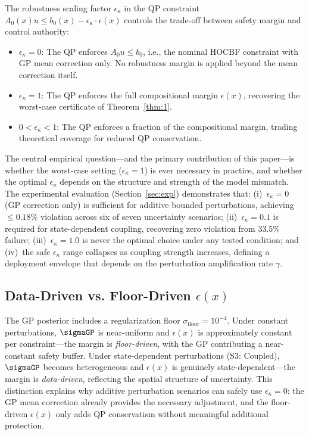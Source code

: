 The robustness scaling factor $\epsilon_\kappa$ in the QP constraint $A_0(x)u \leq b_0(x) - \epsilon_\kappa\cdot\epsilon(x)$ controls the trade-off between safety margin and control authority:

\begin{itemize}
    \item $\epsilon_\kappa = 0$: The QP enforces $A_0u \leq b_0$, i.e., the nominal HOCBF constraint with GP mean correction only. No robustness margin is applied beyond the mean correction itself.
    \item $\epsilon_\kappa = 1$: The QP enforces the full compositional margin $\epsilon(x)$, recovering the worst-case certificate of Theorem~\ref{thm:1}.
    \item $0 < \epsilon_\kappa < 1$: The QP enforces a fraction of the compositional margin, trading theoretical coverage for reduced QP conservatism.
\end{itemize}

The central empirical question---and the primary contribution of this paper---is whether the worst-case setting ($\epsilon_\kappa=1$) is ever necessary in practice, and whether the optimal $\epsilon_\kappa$ depends on the structure and strength of the model mismatch. The experimental evaluation (Section~\ref{sec:exp}) demonstrates that: (i)~$\epsilon_\kappa=0$ (GP correction only) is sufficient for additive bounded perturbations, achieving $\leq0.18\%$ violation across six of seven uncertainty scenarios; (ii)~$\epsilon_\kappa=0.1$ is required for state-dependent coupling, recovering zero violation from 33.5\% failure; (iii)~$\epsilon_\kappa=1.0$ is never the optimal choice under any tested condition; and (iv)~the safe $\epsilon_\kappa$ range collapses as coupling strength increases, defining a deployment envelope that depends on the perturbation amplification rate $\gamma$.

\subsection{Data-Driven vs. Floor-Driven $\epsilon(x)$}

The GP posterior includes a regularization floor $\sigma_{\mathrm{floor}}=10^{-4}$. Under constant perturbations, $\sigmaGP$ is near-uniform and $\epsilon(x)$ is approximately constant per constraint---the margin is \emph{floor-driven}, with the GP contributing a near-constant safety buffer. Under state-dependent perturbations (S3: Coupled), $\sigmaGP$ becomes heterogeneous and $\epsilon(x)$ is genuinely state-dependent---the margin is \emph{data-driven}, reflecting the spatial structure of uncertainty. This distinction explains why additive perturbation scenarios can safely use $\epsilon_\kappa=0$: the GP mean correction already provides the necessary adjustment, and the floor-driven $\epsilon(x)$ only adds QP conservatism without meaningful additional protection.

